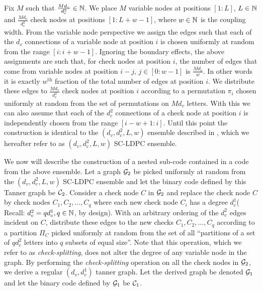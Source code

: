 \documentclass[journal,twocolumn]{IEEEtran}
\begin{document}
Fix $M$ such that $\frac{Md_{v}}{d_{c}^{2}}\in \mathbb{N}$. We place $M$ variable nodes at positions $[1: L]$, $L\in\mathbb{N}$ and $\frac{Md_{v}}{d_{c}^{2}}$ check nodes at positions $[1 : L+w-1]$, where $w\in \mathbb{N}$ is the coupling width. From the variable node perspective we assign the edges such that each of the $d_{v}$ connections of a variable node at position $i$ is chosen uniformly at random from the range $[i : i+w-1]$. Ignoring the boundary effects, the above assignments are such that, for check nodes  at position $i$, the number of edges that come from variable nodes at position $i-j$, $j\in[0:w-1]$ is $\frac{Md_{v}}{w}$. In other words it is exactly $w^{\text{th}}$ fraction of the total number of edges at position $i$. We distribute these edges to $\frac{Md_{v}}{d_{c}^{2}}$ check nodes at position $i$ according to a permutation $\pi_{i}$ chosen uniformly at random from the set of permutations on $Md_{v}$ letters. With this we can also assume that each of the $d_{c}^{2}$ connections of a check node at position $i$ is independently chosen from the range $[i-w+1 : i]$. Until this point the construction is identical to the $(d_{v},d_{c}^{2},L,w)$ ensemble described in \cite{KudekarUrbanke11}, which we hereafter refer to as $(d_{v},d_{c}^{2},L,w)$ SC-LDPC ensemble. 

We now will describe the construction of a nested sub-code contained in a code from the above ensemble. Let a graph $\mathcal{G}_{2}$ be picked uniformly at random from the  $(d_{v},d_{c}^{2},L,w)$ SC-LDPC ensemble and let the binary code defined by this Tanner graph be $\mathcal{C}_{2}$. Consider a check node $C$ in $\mathcal{G}_{2}$ and
replace the check node $C$ by check nodes $C_{1}, C_{2}, \ldots, C_{q}$ where each new check node $C_{i}$ has a degree $d_{c}^{1}$( Recall: $d_{c}^{2}=q d_{c}^{1},q\in \mathbb{N}$, by design). With an arbitrary ordering of the $d_{c}^{2}$ edges incident on $C$, distribute these edges to the new checks $C_{1}, C_{2}, \ldots, C_{q}$ according to a partition $\Pi_{C}$ picked uniformly at random from the set of all ``partitions of a set of $qd_{c}^{2}$ letters into $q$ subsets of equal size''. 
Note that this operation, which we refer to as \textit{check-splitting}, does not alter the degree of  any variable node in the graph. By performing the \textit{check-splitting} operation on all the check nodes in $\mathcal{G}_{2}$, we derive a regular $(d_{v},d_{c}^{1})$ tanner graph. Let the derived graph be denoted $\mathcal{G}_{1}$ and let the binary code defined by $\mathcal{G}_{1}$ be $\mathcal{C}_{1}$.
\end{document}
